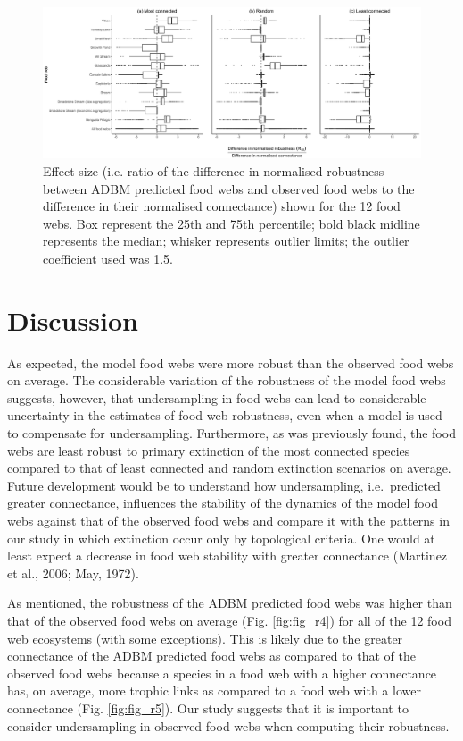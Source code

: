 \documentclass{article}
\begin{document}
\begin{figure}

{\centering \includegraphics[width=450px]{../results/plot_R50_slope} 

}

\caption{\label{fig:fig_r5} Effect size (i.e. ratio of the difference in normalised robustness between ADBM predicted food webs and observed food webs to the difference in their normalised connectance) shown for the 12 food webs. Box represent the 25th and 75th percentile; bold black midline represents the median; whisker represents outlier limits; the outlier coefficient used was 1.5.}\label{fig:unnamed-chunk-3}
\end{figure}

\hypertarget{discussion}{%
\section{Discussion}\label{discussion}}

As expected, the model food webs were more robust than the observed food
webs on average. The considerable variation of the robustness of the
model food webs suggests, however, that undersampling in food webs can
lead to considerable uncertainty in the estimates of food web
robustness, even when a model is used to compensate for undersampling.
Furthermore, as was previously found, the food webs are least robust to
primary extinction of the most connected species compared to that of
least connected and random extinction scenarios on average. Future
development would be to understand how undersampling, i.e.~predicted
greater connectance, influences the stability of the dynamics of the
model food webs against that of the observed food webs and compare it
with the patterns in our study in which extinction occur only by
topological criteria. One would at least expect a decrease in food web
stability with greater connectance (Martinez et al., 2006; May, 1972).

As mentioned, the robustness of the ADBM predicted food webs was higher
than that of the observed food webs on average (Fig. \ref{fig:fig_r4})
for all of the 12 food web ecosystems (with some exceptions). This is
likely due to the greater connectance of the ADBM predicted food webs as
compared to that of the observed food webs because a species in a food
web with a higher connectance has, on average, more trophic links as
compared to a food web with a lower connectance (Fig. \ref{fig:fig_r5}).
Our study suggests that it is important to consider undersampling in
observed food webs when computing their robustness.
\end{document}
